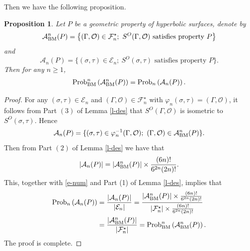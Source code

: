 \documentclass{amsart}
\theoremstyle{plain}
\newtheorem{proposition}[theorem]{Proposition}
\theoremstyle{definition}
\theoremstyle{remark}
\begin{document}
Then we have the following proposition.
\begin{proposition}\label{p-prob}
    Let $P$ be a geometric property of hyperbolic surfaces, denote by
    $$\mathcal{A}_{\textnormal{BM}}^n(P)=\left\{(\Gamma,\mathcal{O})\in\mathcal{F}_n^\star;\ S^O(\Gamma,\mathcal{O})\text{ satisfies property }P\right\}$$
    and 
    $$\mathcal{A}_n(P)=\{(\sigma,\tau)\in\mathcal{E}_n;\ S^O(\sigma,\tau)\text{ satisfies property }P\}.$$
    Then for any $n\geq 1$, 
    \begin{align*}
    \textnormal{Prob}_{\textnormal{BM}}^n\left(\mathcal{A}_{\textnormal{BM}}^n(P)\right)
        =\textnormal{Prob}_n\left(\mathcal{A}_n(P)\right).
    \end{align*}
\end{proposition}
\begin{proof}
For any $(\sigma,\tau)\in\mathcal{E}_n$ and $(\Gamma,\mathcal{O})\in\mathcal{F}_n^\star$ with $\varphi_n(\sigma,\tau)=(\Gamma,\mathcal{O})$, it follows from Part $(3)$ of Lemma \ref{l-des} that $S^O(\Gamma,\mathcal{O})$ is isometric to $S^O(\sigma,\tau)$. Hence
    $$\mathcal{A}_n(P)=\{(\sigma,\tau)\in\varphi_n^{-1}(\Gamma,\mathcal{O}); \ (\Gamma,\mathcal{O})\in\mathcal{A}_{\textnormal{BM}}^n(P)\}.$$
Then from Part $(2)$ of Lemma \ref{l-des} we have that
    $$|\mathcal{A}_n(P)|=|\mathcal{A}_{\textnormal{BM}}^n(P)|\times\frac{(6n)!}{6^{2n}(2n)!}.$$
This, together with \eqref{e-num} and  Part (1) of Lemma \ref{l-des}, implies that    \begin{align*}
        \textnormal{Prob}_n\left(\mathcal{A}_n(P)\right)&=\frac{|\mathcal{A}_n(P)|}{|\mathcal{E}_n|}=\frac{|\mathcal{A}_{\textnormal{BM}}^n(P)|\times\frac{(6n)!}{6^{2n}(2n)!}}{|\mathcal{F}_n^\star|\times\frac{(6n)!}{6^{2n}(2n)!}}\\
        &=\frac{|\mathcal{A}_{\textnormal{BM}}^n(P)|}{|\mathcal{F}_n^\star|}=
        \textnormal{Prob}_{\textnormal{BM}}^n\left(\mathcal{A}_{\textnormal{BM}}^n(P)\right).
    \end{align*}
    The proof is complete.
\end{proof}
 
\end{document}
